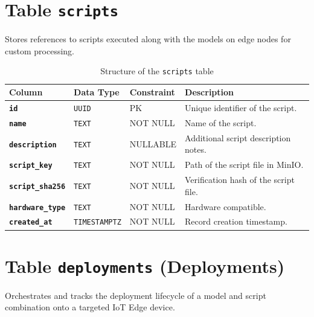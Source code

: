 \section{Table \texttt{scripts}}
Stores references to scripts executed along with the models on edge nodes for custom processing.

\begin{table}[H]
    \centering
    \caption{Structure of the \texttt{scripts} table}
    \label{tab:scripts}
    \begin{tabular}{p{}
                    p{}
                    p{}
                    p{}}
        \hline
        \textbf{Column} & \textbf{Data Type} & \textbf{Constraint} & \textbf{Description} \\
        \hline
        \textbf{\texttt{id}} & \texttt{UUID} & \gls{PK} & Unique identifier of the script. \\
        \textbf{\texttt{name}} & \texttt{TEXT} & NOT NULL & Name of the script. \\
        \textbf{\texttt{description}} & \texttt{TEXT} & NULLABLE & Additional script description notes. \\
        \textbf{\texttt{script\_key}} & \texttt{TEXT} & NOT NULL & Path of the script file in MinIO. \\
        \textbf{\texttt{script\_sha256}} & \texttt{TEXT} & NOT NULL & Verification hash of the script file. \\
        \textbf{\texttt{hardware\_type}} & \texttt{TEXT} & NOT NULL & Hardware compatible. \\
        \textbf{\texttt{created\_at}} & \texttt{TIMESTAMPTZ} & NOT NULL & Record creation timestamp. \\
        \hline
    \end{tabular}
\end{table}

\section{Table \texttt{deployments} (Deployments)}
Orchestrates and tracks the deployment lifecycle of a model and script combination onto a targeted \gls{IoT} Edge device.

